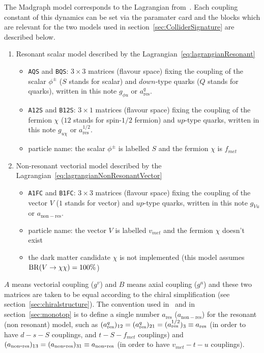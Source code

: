 The Madgraph model corresponds to the Lagrangian from~\cite{AndreaFuksMaltoni}. Each coupling constant of this dynamics can be set via the paramater card and 
the blocks which are relevant for the two models used in section~\ref{sec:ColliderSignature} are described below.
\begin{enumerate}

\item Resonant scalar model described by the Lagrangian~\eqref{eq:lagrangianResonant}
  \begin{itemize}
  \item \texttt{AQS} and \texttt{BQS}: $3\times 3$ matrices (flavour space) fixing the coupling of the scalar $\phi^{\pm}$ ($S$ stands for scalar) and $down$-type 
    quarks ($Q$ stands for quarks), written in this note $g_{\phi u}$ or $a^{q}_{\mathrm{res}}$.
  \item \texttt{A12S} and \texttt{B12S}: $3\times 1$ matrices (flavour space) fixing the coupling of the fermion $\chi$ ($12$ stands for spin-$1/2$ fermion) 
    and $up$-type quarks, written in this note $g_{u \chi}$ or $a^{1/2}_{\mathrm{res}}$.
  \item particle name: the scalar $\phi^{\pm}$ is labelled $S$ and the fermion $\chi$ is $f_{met}$
  \end{itemize}  
  
\item Non-resonant vectorial model described by the Lagrangian~\eqref{eq:lagrangianNonResonantVector}
\begin{itemize}
\item \texttt{A1FC} and \texttt{B1FC}: $3\times 3$ matrices (flavour space) fixing the coupling of the vector $V$ 
  ($1$ stands for vector) and $up$-type quarks, written in this note $g_{Vu}$ or $a_{\mathrm{non-res}}$.
\item particle name: the vector $V$ is labelled $v_{met}$ and the fermion $\chi$ doesn't exist
\item the dark matter candidate $\chi$ is not implemented (this model assumes $\mathrm{BR}({V} \to {\chi\chi})=100\%$)
\end{itemize}

\end{enumerate}

$A$ means vectorial coupling ($g^{v}$) and $B$ means axial coupling ($g^{a}$) and these two matrices 
are taken to be equal according to the chiral simplification (see section~\ref{sec:chiralstructure}).
The convention used in~\cite{ATLASmonotop} and in section~\ref{sec:monotop} is to define a single number $a_{\mathrm{res}}$ ($a_{\mathrm{non-res}}$) 
for the resonant (non resonant) model, such as $(a_{\mathrm{res}}^q)_{\mathrm{12}}=(a_{\mathrm{res}}^q)_{\mathrm{21}}=(a_{\mathrm{res}}^{1/2})_{\mathrm{3}}\equiv a_{\mathrm{res}}$ 
(in order to have $d-s-S$ couplings, and $t-S-f_{met}$ couplings) 
and $(a_{\mathrm{non\mbox{-}res}})_{\mathrm{13}}=(a_{\mathrm{non\mbox{-}res}})_{\mathrm{31}}\equiv a_{\mathrm{non\mbox{-}res}}$ (in order to have $v_{met}-t-u$ couplings). 

